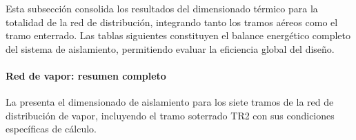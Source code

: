 Esta subsección consolida los resultados del dimensionado térmico para la totalidad de la red de distribución, integrando tanto los tramos aéreos como el tramo enterrado. Las tablas siguientes constituyen el balance energético completo del sistema de aislamiento, permitiendo evaluar la eficiencia global del diseño.

\paragraph{Red de vapor: resumen completo}
\label{par:resumen_vapor_completo}

La  presenta el dimensionado de aislamiento para los siete tramos de la red de distribución de vapor, incluyendo el tramo soterrado TR2 con sus condiciones específicas de cálculo.

